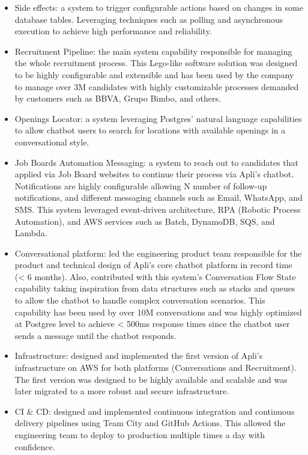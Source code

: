 \documentclass[9pt]{developercv} %
\begin{document}
\begin{entrylist}
{            \begin{itemize}
                \item Side effects: a system to trigger configurable actions based on changes in some database tables. Leveraging techniques such as polling and asynchronous execution to achieve high performance and reliability.
                \item Recruitment Pipeline: the main system capability responsible for managing the whole recruitment process. This Lego-like software solution was designed to be highly configurable and extensible and has been used by the company to manage over 3M candidates with highly customizable processes demanded by customers such as BBVA, Grupo Bimbo, and others.
                \item Openings Locator: a system leveraging Postgres' natural language capabilities to allow chatbot users to search for locations with available openings in a conversational style.
                \item Job Boards Automation Messaging: a system to reach out to candidates that applied via Job Board websites to continue their process via Apli's chatbot. Notifications are highly configurable allowing N number of follow-up notifications, and different messaging channels such as Email, WhatsApp, and SMS. This system leveraged event-driven architecture, RPA (Robotic Process Automation), and AWS services such as Batch, DynamoDB, SQS, and Lambda.
                \item Conversational platform: led the engineering product team responsible for the product and technical design of Apli's core chatbot platform in record time (< 6 months). Also, contributed with this system's Conversation Flow State capability taking inspiration from data structures such as stacks and queues to allow the chatbot to handle complex conversation scenarios. This capability has been used by over 10M conversations and was highly optimized at Postgres level to achieve < 500ms response times since the chatbot user sends a message until the chatbot responds.
                \item Infrastructure: designed and implemented the first version of Apli's infrastructure on AWS for both platforms (Conversations and Recruitment). The first version was designed to be highly available and scalable and was later migrated to a more robust and secure infrastructure. 
                \item CI \& CD: designed and implemented continuous integration and continuous delivery pipelines using Team City and GitHub Actions. This allowed the engineering team to deploy to production multiple times a day with confidence.
            \end{itemize}

}
\end{entrylist}
\end{document}
